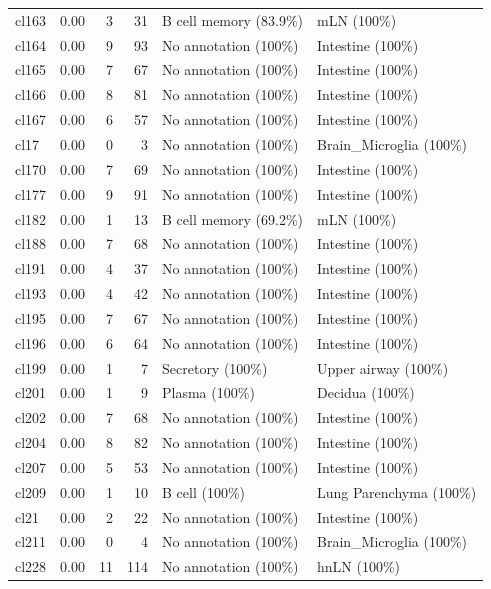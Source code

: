 \begin{table}[ht!]
\begin{tabular}{lrrrll}
  cl163 & 0.00 &   3 &  31 & B cell memory (83.9\%) & mLN (100\%) \\ 
  cl164 & 0.00 &   9 &  93 & No annotation (100\%) & Intestine (100\%) \\ 
  cl165 & 0.00 &   7 &  67 & No annotation (100\%) & Intestine (100\%) \\ 
  cl166 & 0.00 &   8 &  81 & No annotation (100\%) & Intestine (100\%) \\ 
  cl167 & 0.00 &   6 &  57 & No annotation (100\%) & Intestine (100\%) \\ 
  cl17 & 0.00 &   0 &   3 & No annotation (100\%) & Brain\_Microglia (100\%) \\ 
  cl170 & 0.00 &   7 &  69 & No annotation (100\%) & Intestine (100\%) \\ 
  cl177 & 0.00 &   9 &  91 & No annotation (100\%) & Intestine (100\%) \\ 
  cl182 & 0.00 &   1 &  13 & B cell memory (69.2\%) & mLN (100\%) \\ 
  cl188 & 0.00 &   7 &  68 & No annotation (100\%) & Intestine (100\%) \\ 
  cl191 & 0.00 &   4 &  37 & No annotation (100\%) & Intestine (100\%) \\ 
  cl193 & 0.00 &   4 &  42 & No annotation (100\%) & Intestine (100\%) \\ 
  cl195 & 0.00 &   7 &  67 & No annotation (100\%) & Intestine (100\%) \\ 
  cl196 & 0.00 &   6 &  64 & No annotation (100\%) & Intestine (100\%) \\ 
  cl199 & 0.00 &   1 &   7 & Secretory (100\%) & Upper airway (100\%) \\ 
  cl201 & 0.00 &   1 &   9 & Plasma (100\%) & Decidua (100\%) \\ 
  cl202 & 0.00 &   7 &  68 & No annotation (100\%) & Intestine (100\%) \\ 
  cl204 & 0.00 &   8 &  82 & No annotation (100\%) & Intestine (100\%) \\ 
  cl207 & 0.00 &   5 &  53 & No annotation (100\%) & Intestine (100\%) \\ 
  cl209 & 0.00 &   1 &  10 & B cell (100\%) & Lung Parenchyma (100\%) \\ 
  cl21 & 0.00 &   2 &  22 & No annotation (100\%) & Intestine (100\%) \\ 
  cl211 & 0.00 &   0 &   4 & No annotation (100\%) & Brain\_Microglia (100\%) \\ 
  cl228 & 0.00 &  11 & 114 & No annotation (100\%) & hnLN (100\%) \\ 

\end{tabular}
\end{table}
